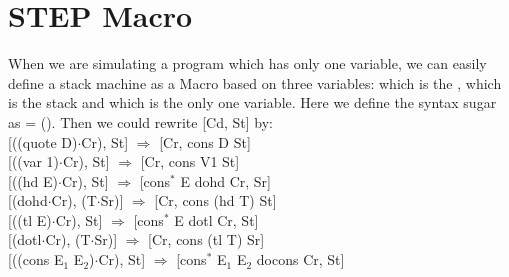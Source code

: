 \section{STEP Macro}\label{appendix:step}
When we are simulating a \WHILE program which has only one variable, we can easily define a stack machine as a Macro based on three variables:  which is the ,  which is the stack and  which is the only one variable.
Here we define the syntax sugar  as   =   (). 
Then we could rewrite [Cd, St] by:\\
\indent\hspace{0.5cm}[((quote D)$\cdot$Cr), St]\hspace{1.55cm} $\Rightarrow$ \hspace{0.5cm} [Cr, cons D St]\\
\indent\hspace{0.5cm}[((var 1)$\cdot$Cr), St]\hspace{2.1cm} $\Rightarrow$ \hspace{0.5cm} [Cr, cons V1 St]\\
\indent\hspace{0.5cm}[((hd E)$\cdot$Cr), St]\hspace{2.15cm} $\Rightarrow$ \hspace{0.5cm} [cons$^{*}$ E dohd Cr, Sr]\\
\indent\hspace{0.5cm}[(dohd$\cdot$Cr), (T$\cdot$Sr)]\hspace{1.7cm} $\Rightarrow$ \hspace{0.5cm} [Cr, cons (hd T) St]\\
\indent\hspace{0.5cm}[((tl E)$\cdot$Cr), St]\hspace{2.35cm} $\Rightarrow$ \hspace{0.5cm} [cons$^{*}$ E dotl Cr, St]\\
\indent\hspace{0.5cm}[(dotl$\cdot$Cr), (T$\cdot$Sr)]\hspace{1.9cm} $\Rightarrow$ \hspace{0.5cm} [Cr, cons (tl T) Sr]\\
\indent\hspace{0.5cm}[((cons E$_1$ E$_2$)$\cdot$Cr), St]\hspace{1.1cm} $\Rightarrow$ \hspace{0.5cm} [cons$^{*}$ E$_1$ E$_2$ docons Cr, St]\\
